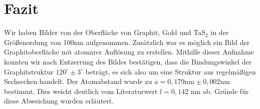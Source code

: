 \section{Fazit}
Wir haben Bilder von der Oberfläche von Graphit, Gold und TaS$_2$ in der Größenordung von 100nm aufgenommen. Zusätzlich war es möglich ein Bild der Graphitoberfläche mit atomarer Auflösung zu erstellen. Mithilfe dieser Aufnahme konnten wir nach Entzerrung des Bildes bestätigen, dass die Bindungswinkel der Graphitstruktur $120^\circ \pm 3^\circ$ beträgt, es sich also um eine Struktur aus regelmäßigen Sechsecken handelt. Der Atomabstand wurde zu $a = 0,179\si{\nano\metre} \pm 0,002\si{\nano\metre}$ bestimmt. Dies weicht deutlich vom Literaturwert $l=0,142$ nm ab. Gründe für diese Abweichung wurden erläutert.



